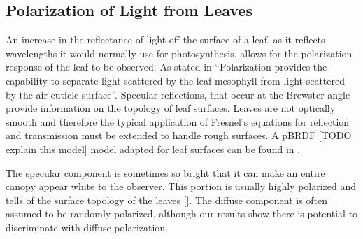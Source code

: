 \subsection{Polarization of Light from Leaves}

An increase in the reflectance of light off the surface of a leaf, as it reflects wavelengths it would normally use for photosynthesis, allows for the polarization response of the leaf to be observed.  As stated in \cite{photonvegetation} “Polarization provides the capability to separate light scattered by the leaf mesophyll from light scattered by the air-cuticle surface”.  Specular reflections, that occur at the Brewster angle provide information on the topology of leaf surfaces.  Leaves are not optically smooth and therefore the typical application of Fresnel’s equations for reflection and transmission must be extended to handle rough surfaces. A pBRDF [TODO explain this model] model adapted for leaf surfaces can be found in \cite{photonvegetation}.

The specular component is sometimes so bright that it can make an entire canopy appear white to the observer.  This portion is usually highly polarized and tells of the surface topology of the leaves [\cite{vanderbilt}].  The diffuse component is often assumed to be randomly polarized, although our results show there is potential to discriminate with diffuse polarization.
